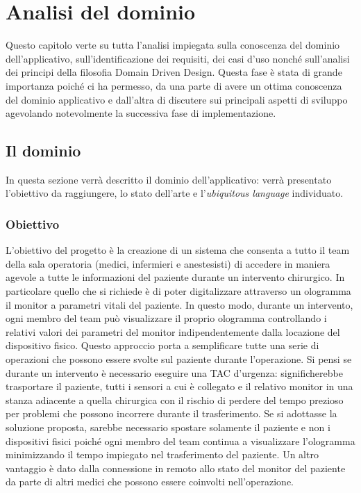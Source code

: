 
\chapter{Analisi del dominio}
Questo capitolo verte su tutta l'analisi impiegata sulla conoscenza del dominio dell'applicativo, sull'identificazione dei requisiti, dei casi d'uso nonché sull'analisi dei principi della filosofia Domain Driven Design. \newline \newline Questa fase è stata di grande importanza poiché ci ha permesso, da una parte di avere un ottima conoscenza del dominio applicativo e dall'altra di discutere sui principali aspetti di sviluppo agevolando notevolmente la successiva fase di implementazione.

\section{Il dominio}
In questa sezione verrà descritto il dominio dell'applicativo: verrà presentato l'obiettivo da raggiungere, lo stato dell'arte e l'\textit{ubiquitous language} individuato.
 
\subsection{Obiettivo}

L'obiettivo del progetto è la creazione di un sistema che consenta a tutto il team della sala operatoria (medici, infermieri e anestesisti) di accedere in maniera agevole a tutte le informazioni del paziente durante un intervento chirurgico. In particolare quello che si richiede è di poter digitalizzare attraverso un ologramma il monitor a parametri vitali del paziente. In questo modo, durante un intervento, ogni membro del team può visualizzare il proprio ologramma controllando i relativi valori dei parametri del monitor indipendentemente dalla locazione del dispositivo fisico. \newline \newline Questo approccio porta a semplificare tutte una serie di operazioni che possono essere svolte sul paziente durante l'operazione. Si pensi se durante un intervento è necessario eseguire una TAC d'urgenza: significherebbe trasportare il paziente, tutti i sensori a cui è collegato e il relativo monitor in una stanza adiacente a quella chirurgica con il rischio di perdere del tempo prezioso per problemi che possono incorrere durante il trasferimento. Se si adottasse la soluzione proposta, sarebbe necessario spostare solamente il paziente e non i dispositivi fisici poiché ogni membro del team continua a visualizzare l'ologramma minimizzando il tempo impiegato nel trasferimento del paziente.
Un altro vantaggio è dato dalla connessione in remoto allo stato del monitor del paziente da parte di altri medici che possono essere coinvolti nell'operazione.

